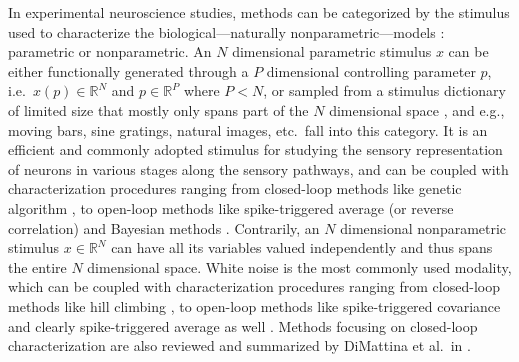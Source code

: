 In experimental neuroscience studies, methods can be categorized by the stimulus used to characterize the biological---naturally nonparametric---models \cite{wu2006complete}: parametric or nonparametric. An $N$ dimensional parametric stimulus $x$ can be either functionally generated through a $P$ dimensional controlling parameter $p$, i.e.~$x\left(p\right) \in \mathbb{R}^N$ and $p \in \mathbb{R}^P$ where $P < N$, or sampled from a stimulus dictionary of limited size that mostly only spans part of the $N$ dimensional space \cite{field1987relations}, and e.g., moving bars, sine gratings, natural images, etc.~fall into this category. It is an efficient and commonly adopted stimulus for studying the sensory representation of neurons in various stages along the sensory pathways, and can be coupled with characterization procedures ranging from closed-loop methods like genetic algorithm \cite{bleeck2003using, yamane2008neural}, to open-loop methods like spike-triggered average (or reverse correlation) \cite{ringach2004reverse, hansen2004parametric, dotsch2012reverse} and Bayesian methods \cite{naselaris2009bayesian, nishimoto2011reconstructing}. Contrarily, an $N$ dimensional nonparametric stimulus $x \in \mathbb{R}^N$ can have all its variables valued independently and thus spans the entire $N$ dimensional space. White noise is the most commonly used modality, which can be coupled with characterization procedures ranging from closed-loop methods like hill climbing \cite{harth1974alopex}, to open-loop methods like spike-triggered covariance \cite{touryan2002isolation, rust2004spike} and clearly spike-triggered average as well \cite{ringach2004reverse}. Methods focusing on closed-loop characterization are also reviewed and summarized by DiMattina et al.~in \cite{dimattina2013adaptive}. %


